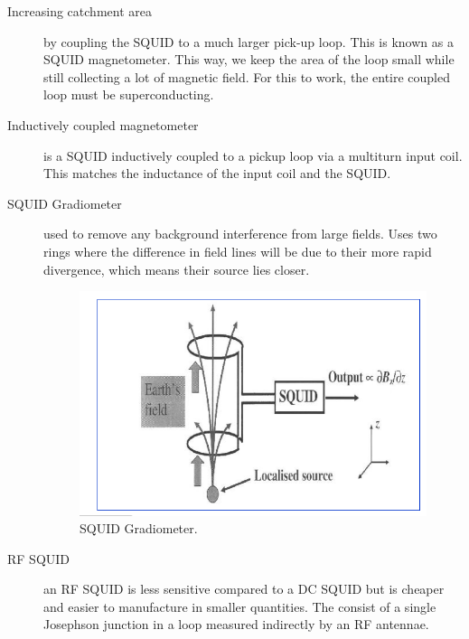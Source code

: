 \begin{description}
\item[Increasing catchment area] by coupling the SQUID to a much larger pick-up loop. This is known as a SQUID magnetometer. This way, we keep the area of the loop small while still collecting a lot of magnetic field. For this to work, the entire coupled loop must be superconducting. 

\item[Inductively coupled magnetometer] is a SQUID inductively coupled to a pickup loop via a multiturn input coil. This matches the inductance of the input coil and the SQUID. 


\item[SQUID Gradiometer] used to remove any background interference from large fields. Uses two rings where the difference in field lines will be due to their more rapid divergence, which means their source lies closer. 

\begin{figure}[h]
  \caption{SQUID Gradiometer.}
  \centering
    \includegraphics[width=\textwidth]{./SC_figures/SQUID_Gradiometer.PNG}
\end{figure}


\item[RF SQUID] an RF SQUID is less sensitive compared to a DC SQUID but is cheaper and easier to manufacture in smaller quantities. The consist of a single Josephson junction in a loop measured indirectly by an RF antennae. 



\end{description}
